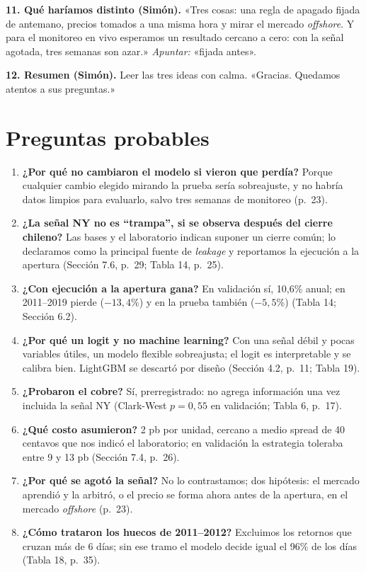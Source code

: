 \documentclass[11pt]{article}
\newcommand{\apunta}[1]{\textcolor{azul}{\emph{Apuntar:} #1}}
\begin{document}
\textbf{11. Qué haríamos distinto (Simón).} «Tres cosas: una regla de apagado fijada de antemano, precios tomados a una misma hora y mirar el mercado \emph{offshore}. Y para el monitoreo en vivo esperamos un resultado cercano a cero: con la señal agotada, tres semanas son azar.» \apunta{«fijada antes».}

\textbf{12. Resumen (Simón).} Leer las tres ideas con calma. «Gracias. Quedamos atentos a sus preguntas.»

\section{Preguntas probables}
\begin{enumerate}[leftmargin=*]
\item \textbf{¿Por qué no cambiaron el modelo si vieron que perdía?} Porque cualquier cambio elegido mirando la prueba sería sobreajuste, y no habría datos limpios para evaluarlo, salvo tres semanas de monitoreo (p.~23).
\item \textbf{¿La señal NY no es ``trampa'', si se observa después del cierre chileno?} Las bases y el laboratorio indican suponer un cierre común; lo declaramos como la principal fuente de \emph{leakage} y reportamos la ejecución a la apertura (Sección 7.6, p.~29; Tabla 14, p.~25).
\item \textbf{¿Con ejecución a la apertura gana?} En validación sí, 10,6\% anual; en 2011--2019 pierde ($-13{,}4$\%) y en la prueba también ($-5{,}5$\%) (Tabla 14; Sección 6.2).
\item \textbf{¿Por qué un logit y no machine learning?} Con una señal débil y pocas variables útiles, un modelo flexible sobreajusta; el logit es interpretable y se calibra bien. LightGBM se descartó por diseño (Sección 4.2, p.~11; Tabla 19).
\item \textbf{¿Probaron el cobre?} Sí, prerregistrado: no agrega información una vez incluida la señal NY (Clark-West \(p=0{,}55\) en validación; Tabla 6, p.~17).
\item \textbf{¿Qué costo asumieron?} 2 pb por unidad, cercano a medio spread de 40 centavos que nos indicó el laboratorio; en validación la estrategia toleraba entre 9 y 13 pb (Sección 7.4, p.~26).
\item \textbf{¿Por qué se agotó la señal?} No lo contrastamos; dos hipótesis: el mercado aprendió y la arbitró, o el precio se forma ahora antes de la apertura, en el mercado \emph{offshore} (p.~23).
\item \textbf{¿Cómo trataron los huecos de 2011--2012?} Excluimos los retornos que cruzan más de 6 días; sin ese tramo el modelo decide igual el 96\% de los días (Tabla 18, p.~35).

\end{enumerate}
\end{document}
